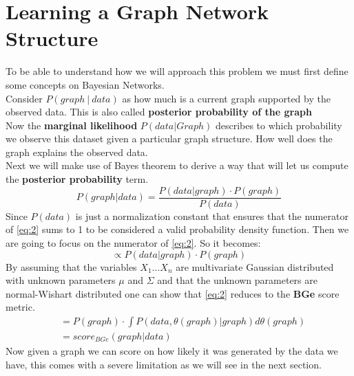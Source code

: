 \documentclass{article}
\begin{document}
	\section{Learning a Graph Network Structure}
	To be able to understand how we will approach this problem we must first
	define some concepts on Bayesian Networks. 
	\\	
	Consider $P(graph \ | \ data)$
	as how much is a current graph supported by the observed data. This is also
	called \textbf{posterior probability of the graph}
	\\
	Now the \textbf{marginal likelihood} $P(data|Graph)$ describes to which
	probability we observe this dataset given a particular graph
	structure. How well does the graph explains the observed data.
	\\
	Next we will make use of Bayes theorem to derive a way that will let us
	compute the \textbf{posterior probability} term.
	\begin{equation}
		P(graph | data) = \frac{P(data|graph) \cdot P(graph)}{P(data)} 
		\label{eq:2}
	\end{equation}
	Since $P(data)$ is just a normalization constant that ensures that the
	numerator of \eqref{eq:2} sums to 1 to be considered a valid probability
	density function. Then we are going to focus on the numerator of
	\eqref{eq:2}. So it becomes:
	\begin{equation}
		\propto P(data|graph) \cdot P(graph)
		\label{eq:3}
	\end{equation}
	By assuming that the variables $X_{1} \dots X_{n}$ are multivariate Gaussian
	distributed with unknown parameters $\mu$ and $\Sigma$ and that the unknown
	parameters are normal-Wishart distributed one can show that \eqref{eq:2}
	reduces to the \textbf{BGe} score metric.
	\begin{equation}
		\begin{aligned}
		 & =P(graph) \cdot \int P(data,\theta(graph) | graph) d\theta(graph) \\	
		 & =score_{BGe}(graph|data)
		\end{aligned}
		\label{eq:4}
	\end{equation}
	Now given a graph we can score on how likely it was generated by the data we
	have, this comes with a severe limitation as we will see in the next section.   
\end{document}
